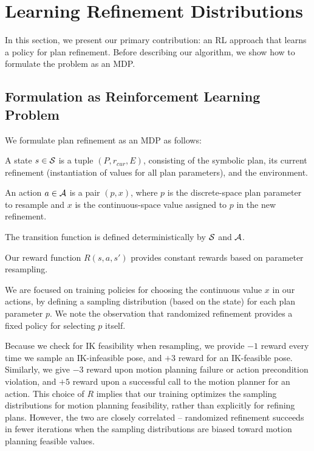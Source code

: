 \section{Learning Refinement Distributions}
In this section, we present our primary contribution: an RL
approach that learns a policy for plan refinement. Before describing our
algorithm, we show how to formulate the problem as an MDP.

\subsection{Formulation as Reinforcement Learning Problem}
We formulate plan refinement as an MDP as follows:
\begin{tightlist}
\item A state $s \in \mathcal{S}$ is a tuple $(P, r_{cur}, E)$, consisting of the
symbolic plan, its current refinement (instantiation of values for all plan parameters),
and the environment.
\item An action $a \in \mathcal{A}$ is a pair $(p, x)$, where $p$ is the discrete-space plan
parameter to resample and $x$ is the continuous-space value assigned to $p$ in the new refinement.
\item The transition function is defined deterministically by $\mathcal{S}$ and $\mathcal{A}$.
\item Our reward function $R(s, a, s')$ provides constant rewards based on parameter resampling.
\end{tightlist}

We are focused on training policies for choosing the continuous value
$x$ in our actions, by defining a sampling distribution (based on the state) for each plan parameter $p$.
We note the observation that randomized refinement provides a fixed policy for selecting $p$ itself.

Because we check for IK feasibility when resampling, we provide $-1$ reward every
time we sample an IK-infeasible pose, and $+3$ reward for an IK-feasible pose.
Similarly, we give $-3$ reward upon motion planning failure or action precondition violation,
and $+5$ reward upon a successful call to the motion planner for an action.
This choice of $R$ implies that our training optimizes the sampling distributions for
motion planning feasibility, rather than explicitly for refining plans. However, the two are
closely correlated -- randomized refinement succeeds in fewer iterations when the sampling
distributions are biased toward motion planning feasible values.

